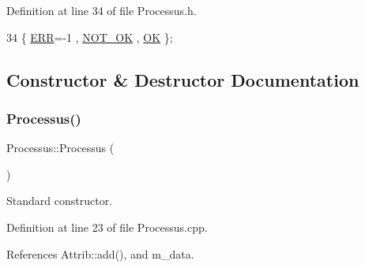 Definition at line 34 of file Processus.\+h.


\begin{DoxyCode}
34 \{ \hyperlink{classProcessus_a36278773bd98f2d5612fea40c7774821adaf73ad5d0a09f952d0f18dbbe1c7493}{ERR}=-1 , \hyperlink{classProcessus_a36278773bd98f2d5612fea40c7774821a629082f49d6e8df6b6da2b8fbb9d80fb}{NOT\_OK} , \hyperlink{classProcessus_a36278773bd98f2d5612fea40c7774821af77c64124fa175f28200166fff165ea2}{OK} \};
\end{DoxyCode}


\subsection{Constructor \& Destructor Documentation}
\mbox{\label{classProcessus_a42ecb4626ba682ee10a313c83327a0f8}} 
\subsubsection{\texorpdfstring{Processus()}{Processus()}}
{\footnotesize\ttfamily Processus\+::\+Processus (\begin{DoxyParamCaption}{ }\end{DoxyParamCaption})}



Standard constructor. 



Definition at line 23 of file Processus.\+cpp.



References Attrib\+::add(), and m\+\_\+data.


